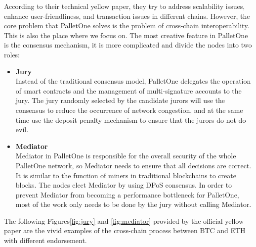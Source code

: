 \noindent According to their technical yellow paper, they try to address scalability issues, enhance user-friendliness, and transaction issues in different chains. However, the core problem that PalletOne solves is the problem of cross-chain interoperability. This is also the place where we focus on. The most creative feature in PalletOne is the consensus mechanism, it is more complicated and divide the nodes into two roles:
\begin{itemize}
    \item \textbf{Jury} \\
    Instead of the traditional consensus model, PalletOne delegates the operation of smart contracts and the management of multi-signature accounts to the jury. The jury randomly selected by the candidate jurors will use the consensus to reduce the occurrence of network congestion, and at the same time use the deposit penalty mechanism to ensure that the jurors do not do evil.
    \item \textbf{Mediator}\\
    Mediator in PalletOne is responsible for the overall security of the whole PalletOne network, so Mediator needs to ensure that all decisions are correct. It is similar to the function of miners in traditional blockchains to create blocks. The nodes elect Mediator by using DPoS consensus. In order to prevent Mediator from becoming a performance bottleneck for PalletOne, most of the work only needs to be done by the jury without calling Mediator.
\end{itemize}
\noindent The following Figures\ref{fig:jury} and \ref{fig:mediator} provided by the official yellow paper are the vivid examples of the cross-chain process between BTC and ETH with different endorsement.


